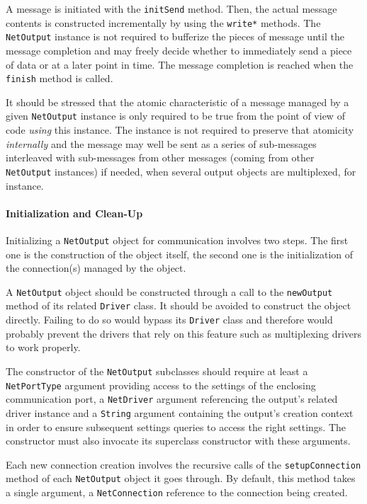 \documentclass[11pt]{book}
\begin{document}
A message is initiated with the \texttt{initSend} method. Then, the
actual message contents is constructed incrementally by using the
\texttt{write*} methods. The \texttt{NetOutput} instance is not
required to bufferize the pieces of message until the message
completion and may freely decide whether to immediately send a piece
of data or at a later point in time. The message completion is reached
when the \texttt{finish} method is called.

It should be stressed that the atomic characteristic of a message
managed by a given \texttt{NetOutput} instance is only required to be
true from the point of view of code \emph{using} this instance. The
instance is not required to preserve that atomicity \emph{internally}
and the message may well be sent as a series of sub-messages
interleaved with sub-messages from other messages (coming from other
\texttt{NetOutput} instances) if needed, when several output objects
are multiplexed, for instance.

\paragraph{Initialization and Clean-Up}
\label{sec:init-clean-up}

Initializing a \texttt{NetOutput} object for communication involves
two steps. The first one is the construction of the object itself, the
second one is the initialization of the connection(s) managed by the
object.

A \texttt{NetOutput} object should be constructed through a call to
the \texttt{newOutput} method of its related \texttt{Driver} class. It
should be avoided to construct the object directly. Failing to do so
would bypass its \texttt{Driver} class and therefore would probably
prevent the drivers that rely on this feature such as multiplexing
drivers to work properly.

The constructor of the \texttt{NetOutput} subclasses should require at
least a \texttt{NetPortType} argument providing access to the settings
of the enclosing communication port, a \texttt{NetDriver} argument
referencing the output's related driver instance and a \texttt{String}
argument containing the output's creation context in order to ensure
subsequent settings queries to access the right settings. The
constructor must also invocate its superclass constructor with these
arguments.

Each new connection creation involves the recursive calls of the
\texttt{setupConnection} method of each \texttt{NetOutput} object it
goes through. By default, this method takes a single argument, a
\texttt{NetConnection} reference to the connection being created.
\end{document}
